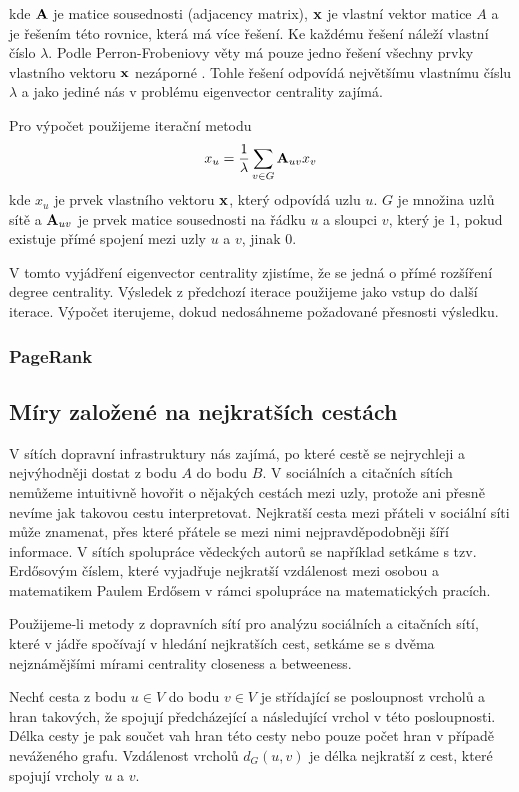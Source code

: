 \documentclass[12pt,titlepage]{report}
\begin{document}
kde ${\bf A}$ je matice sousednosti (adjacency matrix), ${\bf x}$ je vlastní
vektor matice $A$ a je řešením této rovnice, která má více řešení. Ke každému
řešení náleží vlastní číslo $\lambda$. Podle Perron-Frobeniovy věty má pouze
jedno řešení všechny prvky vlastního vektoru ${\bf x}$ nezáporné
\cite{langvillemeyer}. Tohle řešení odpovídá největšímu vlastnímu číslu
$\lambda$ a jako jediné nás v problému eigenvector centrality zajímá. 

Pro výpočet použijeme iterační metodu
\begin{align}
x_u &=  \frac{1}{\lambda} \displaystyle\sum_{v \in G} {\bf A}_{uv} x_v \\
\end{align}
kde $x_u$ je prvek vlastního vektoru ${\bf x}$, který odpovídá uzlu $u$. $G$ je
množina uzlů sítě a ${\bf A}_{uv}$ je prvek matice sousednosti na řádku $u$ a
sloupci $v$, který je $1$, pokud existuje přímé spojení mezi uzly $u$ a $v$,
jinak $0$.

V tomto vyjádření eigenvector centrality zjistíme, že se jedná o přímé
rozšíření degree centrality. Výsledek z předchozí iterace použijeme jako vstup
do další iterace. Výpočet iterujeme, dokud nedosáhneme požadované přesnosti
výsledku.
\subsubsection{PageRank}

\subsection{Míry založené na nejkratších cestách}
V sítích dopravní infrastruktury nás zajímá, po které cestě se nejrychleji a
nejvýhodněji dostat z bodu $A$ do bodu $B$. V sociálních a citačních sítích
nemůžeme intuitivně hovořit o nějakých cestách mezi uzly, protože ani přesně
nevíme jak takovou cestu interpretovat. Nejkratší cesta mezi přáteli v sociální
síti může znamenat, přes které přátele se mezi nimi nejpravděpodobněji šíří
informace. V sítích spolupráce vědeckých autorů se například setkáme s tzv.
Erdősovým číslem, které vyjadřuje nejkratší vzdálenost mezi osobou a
matematikem Paulem Erdősem v rámci spolupráce na matematických pracích.

Použijeme-li metody z dopravních sítí pro analýzu sociálních a citačních sítí,
které v jádře spočívají v hledání nejkratších cest, setkáme se s dvěma
nejznámějšími mírami centrality closeness a betweeness.

Nechť cesta z bodu $u \in V$ do bodu $v \in V$ je střídající se posloupnost
vrcholů a hran takových, že spojují předcházející a následující vrchol v této
posloupnosti. Délka cesty je pak součet vah hran této cesty nebo pouze počet
hran v případě neváženého grafu. Vzdálenost vrcholů $d_G(u, v)$ je délka nejkratší z cest, které spojují vrcholy $u$ a $v$.
\end{document}
